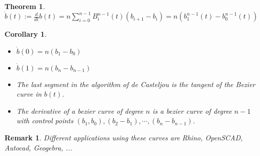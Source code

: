 \documentclass[]{article}
\newtheorem{theorem}{Theorem}
\newtheorem{remark}{Remark}
\newtheorem{corollary}{Corollary}
\begin{document}
\begin{theorem}
	$\dot{b}(t) := \frac{d}{dt} b(t) = n \sum_{i=0}^{n-1} B_i^{n-1}(t)(b_{i+1} - b_i) = n (b_1^{n-1}(t) - b_0^{n-1}(t))$
\end{theorem}

\begin{corollary}
	\begin{itemize}
		\item $\dot{b}(0) = n (b_1 - b_0)$
		\item $\dot{b}(1) = n (b_n - b_{n-1})$
		\item The last segment in the algorithm of de Casteljou is the tangent of the Bezier curve in $b(t)$.
		\item The derivative of a bezier curve of degree $n$ is a bezier curve of degree $n-1$ with control points $(b_1,b_0), (b_2 - b_1), \cdots, (b_n - b_{n-1})$.
	\end{itemize}
\end{corollary}

\begin{remark}
	Different applications using these curves are Rhino, OpenSCAD, Autocad, Geogebra, ...
\end{remark}
\end{document}
